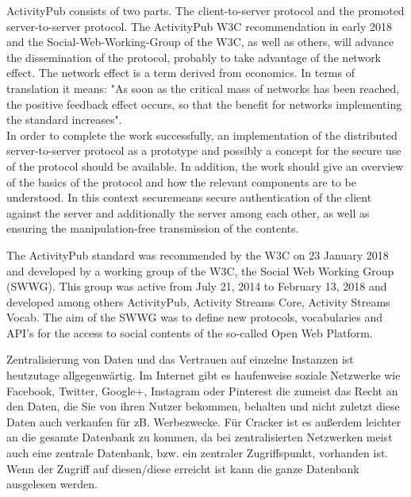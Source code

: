 {	ActivityPub consists of two parts. The client-to-server protocol and the promoted server-to-server protocol. The ActivityPub W3C recommendation in early 2018 and the Social-Web-Working-Group of the W3C, as well as others, will advance the dissemination of the protocol, probably to take advantage of the network effect. The network effect is a term derived from economics. In terms of translation it means: "As soon as the critical mass of networks has been reached, the positive feedback effect occurs, so that the benefit for networks implementing the standard increases".\\
	
	In order to complete the work successfully, an implementation of the distributed server-to-server protocol as a prototype and possibly a concept for the secure use of the protocol should be available. In addition, the work should give an overview of the basics of the protocol and how the relevant components are to be understood. In this context \glqq secure\grqq means secure authentication of the client against the server and additionally the server among each other, as well as ensuring the manipulation-free transmission of the contents.\\
	
	
	The ActivityPub\cite{activityPub} standard was recommended by the W3C on 23 January 2018 and developed by a working group of the W3C, the Social Web Working Group (SWWG)\cite{socialWg,pushSocialWeb}. This group was active from July 21, 2014 to February 13, 2018\cite{socialWg} and developed among others ActivityPub, Activity Streams Core\cite{activityStreamsCore}, Activity Streams Vocab\cite{activityStreamsVocabulary}. The aim of the SWWG was to define new protocols, vocabularies and API's for the access to social contents of the so-called Open Web Platform\cite{social-wg-charter}.

}{
	Zentralisierung von Daten und das Vertrauen auf einzelne Instanzen ist heutzutage allgegenwärtig. Im Internet gibt es haufenweise soziale Netzwerke wie Facebook, Twitter, Google+, Instagram oder Pinterest die zumeist das Recht an den Daten, die Sie von ihren Nutzer bekommen, behalten und nicht zuletzt diese Daten auch verkaufen für zB. Werbezwecke. Für Cracker ist es außerdem leichter an die gesamte Datenbank zu kommen, da bei zentralisierten Netzwerken meist auch eine zentrale Datenbank, bzw. ein zentraler Zugriffspunkt, vorhanden ist. Wenn der Zugriff auf diesen/diese erreicht ist kann die ganze Datenbank ausgelesen werden.\\
		
}
